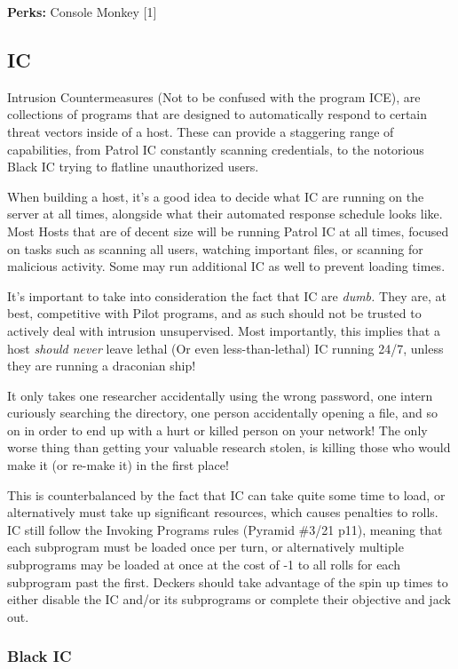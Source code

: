 \begin{multicols}{2}
	\textbf{Perks:}
	Console Monkey [1]
				
	\subsection{IC}
	
	Intrusion Countermeasures (Not to be confused with the program ICE), are collections of programs that are designed to automatically respond to certain threat vectors inside of a host. These can provide a staggering range of capabilities, from Patrol IC constantly scanning credentials, to the notorious Black IC trying to flatline unauthorized users.
	
	When building a host, it's a good idea to decide what IC are running on the server at all times, alongside what their automated response schedule looks like. Most Hosts that are of decent size will be running Patrol IC at all times, focused on tasks such as scanning all users, watching important files, or scanning for malicious activity. Some may run additional IC as well to prevent loading times.
	
	It's important to take into consideration the fact that IC are \textit{dumb.} They are, at best, competitive with Pilot programs, and as such should not be trusted to actively deal with intrusion unsupervised. Most importantly, this implies that a host \textit{should never} leave lethal (Or even less-than-lethal) IC running 24/7, unless they are running a draconian ship! 
	
	It only takes one researcher accidentally using the wrong password, one intern curiously searching the directory, one person accidentally opening a file, and so on in order to end up with a hurt or killed person on your network! The only worse thing than getting your valuable research stolen, is killing those who would make it (or re-make it) in the first place!
	
	This is counterbalanced by the fact that IC can take quite some time to load, or alternatively must take up significant resources, which causes penalties to rolls. IC still follow the Invoking Programs rules (Pyramid \#3/21 p11), meaning that each subprogram must be loaded once per turn, or alternatively multiple subprograms may be loaded at once at the cost of -1 to all rolls for each subprogram past the first. Deckers should take advantage of the spin up times to either disable the IC and/or its subprograms or complete their objective and jack out.
	
	\subsubsection{Black IC}
	

\end{multicols}
